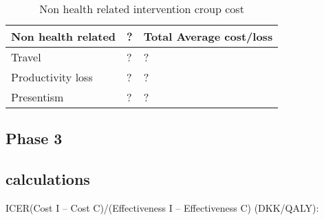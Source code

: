 \begin{table}[H]
\begin{longtabu} to 
    \textbf{Non health related} &        \textbf{?} & \textbf{Total Average cost/loss} \\[-1ex]
    \midrule
     Travel   &    ? & ? \\ \hline
     Productivity loss   &       ? & ? \\ \hline
     Presentism   &        ? & ?
    \newline
   \end{longtabu}
\caption{Non health related intervention croup cost}
\label{tab: IC}
\end{table}

\subsection{Phase 3}





\subsection{calculations}

ICER(Cost I – Cost C)/(Effectiveness I – Effectiveness C) (DKK/QALY):











